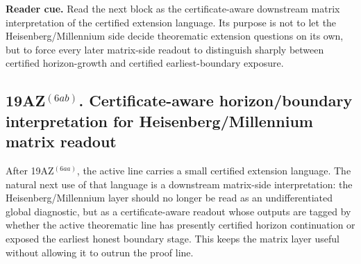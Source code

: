 \noindent\textbf{Reader cue.} Read the next block as the certificate-aware downstream matrix interpretation of the certified extension language. Its purpose is not to let the Heisenberg/Millennium side decide theorematic extension questions on its own, but to force every later matrix-side readout to distinguish sharply between certified horizon-growth and certified earliest-boundary exposure.

\subsection*{19AZ$^{(6ab)}$. Certificate-aware horizon/boundary interpretation for Heisenberg/Millennium matrix readout}
\label{sec:certificate-aware-horizon-boundary-interpretation-for-heisenberg-millennium-matrix-readout}
After 19AZ$^{(6aa)}$, the active line carries a small certified extension language. The natural next use of that language is a downstream matrix-side interpretation: the Heisenberg/Millennium layer should no longer be read as an undifferentiated global diagnostic, but as a certificate-aware readout whose outputs are tagged by whether the active theorematic line has presently certified horizon continuation or exposed the earliest honest boundary stage. This keeps the matrix layer useful without allowing it to outrun the proof line.

